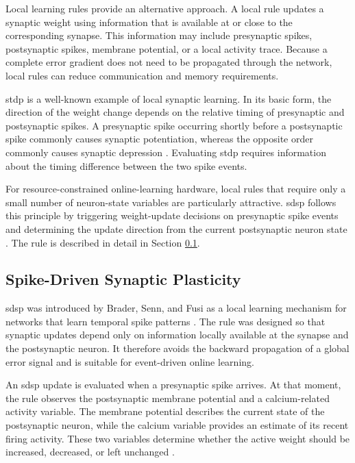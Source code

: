 Local learning rules provide an alternative approach. A local rule updates a synaptic weight using information that is available at or close to the corresponding synapse. This information may include presynaptic spikes, postsynaptic spikes, membrane potential, or a local activity trace. Because a complete error gradient does not need to be propagated through the network, local rules can reduce communication and memory requirements.

\gls{stdp} is a well-known example of local synaptic learning. In its basic form, the direction of the weight change depends on the relative timing of presynaptic and postsynaptic spikes. A presynaptic spike occurring shortly before a postsynaptic spike commonly causes synaptic potentiation, whereas the opposite order commonly causes synaptic depression \cite{BiPoo1998}. Evaluating \gls{stdp} requires information about the timing difference between the two spike events.

For resource-constrained online-learning hardware, local rules that require only a small number of neuron-state variables are particularly attractive. \gls{sdsp} follows this principle by triggering weight-update decisions on presynaptic spike events and determining the update direction from the current postsynaptic neuron state \cite{Brader2007}. The rule is described in detail in Section \ref{subsec: sdsp}.

\subsection{Spike-Driven Synaptic Plasticity}
\label{subsec: sdsp}

\gls{sdsp} was introduced by Brader, Senn, and Fusi as a local learning mechanism for networks that learn temporal spike patterns \cite{Brader2007}. The rule was designed so that synaptic updates depend only on information locally available at the synapse and the postsynaptic neuron. It therefore avoids the backward propagation of a global error signal and is suitable for event-driven online learning.

An \gls{sdsp} update is evaluated when a presynaptic spike arrives. At that moment, the rule observes the postsynaptic membrane potential and a calcium-related activity variable. The membrane potential describes the current state of the postsynaptic neuron, while the calcium variable provides an estimate of its recent firing activity. These two variables determine whether the active weight should be increased, decreased, or left unchanged \cite{Brader2007,Frenkel2019ODIN}.

